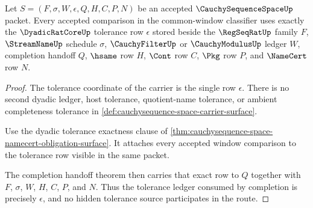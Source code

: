 \begin{theorem}
\label{thm:cauchysequence-space-dyadic-tolerance-ledger-exactness}
Let $S=(F,\sigma,W,\epsilon,Q,H,C,P,N)$ be an accepted $\CauchySequenceSpaceUp$ packet. Every accepted comparison in the common-window classifier uses exactly the $\DyadicRatCoreUp$ tolerance row $\epsilon$ stored beside the $\RegSeqRatUp$ family $F$, $\StreamNameUp$ schedule $\sigma$, $\CauchyFilterUp$ or $\CauchyModulusUp$ ledger $W$, completion handoff $Q$, $\hsame$ row $H$, $\Cont$ row $C$, $\Pkg$ row $P$, and $\NameCert$ row $N$.
\end{theorem}
\begin{proof}
The tolerance coordinate of the carrier is the single row $\epsilon$. There is no second dyadic ledger, host tolerance, quotient-name tolerance, or ambient completeness tolerance in \autoref{def:cauchysequence-space-carrier-surface}.

Use the dyadic tolerance exactness clause of \autoref{thm:cauchysequence-space-namecert-obligation-surface}. It attaches every accepted window comparison to the tolerance row visible in the same packet.

The completion handoff theorem then carries that exact row to $Q$ together with $F$, $\sigma$, $W$, $H$, $C$, $P$, and $N$. Thus the tolerance ledger consumed by completion is precisely $\epsilon$, and no hidden tolerance source participates in the route.
\end{proof}

